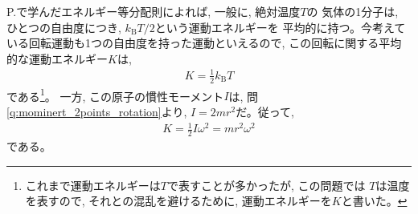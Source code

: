 P.\pageref{def:temperature0}で学んだエネルギー等分配則によれば, 
一般に, 絶対温度$T$の
気体の1分子は, ひとつの自由度につき, $k_{\text{B}}T/2$という運動エネルギーを
平均的に持つ。今考えている回転運動も1つの自由度を持った運動といえるので, 
この回転に関する平均的な運動エネルギー$K$は, 
\begin{eqnarray}
K=\frac{1}{2}k_{\text{B}}T\label{eq:2atommolrot1}
\end{eqnarray}
である\footnote{これまで運動エネルギーは$T$で表すことが多かったが, この問題では
$T$は温度を表すので, それとの混乱を避けるために, 運動エネルギーを$K$と書いた。}。
一方, この原子の慣性モーメント$I$は, 問\ref{q:mominert_2points_rotation}より, 
$I=2mr^2$だ。従って, 
\begin{eqnarray}
K=\frac{1}{2}I\omega^2=mr^2\omega^2\label{eq:2atommolrot2}
\end{eqnarray}
である。

